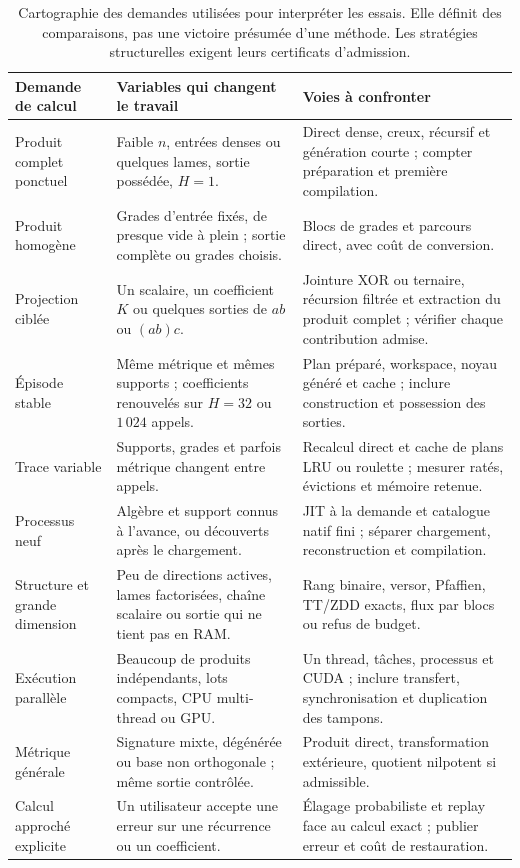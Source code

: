 \documentclass[11pt,a4paper]{article}
\begin{document}
\begin{table}[ht]
\centering\small
\begin{tabularx}{\linewidth}{@{}p{30mm}X X@{}}
\toprule
Demande de calcul & Variables qui changent le travail & Voies à confronter \\
\midrule
Produit complet ponctuel & Faible $n$, entrées denses ou quelques lames, sortie possédée, $H=1$. & Direct dense, creux, récursif et génération courte ; compter préparation et première compilation. \\
Produit homogène & Grades d'entrée fixés, de presque vide à plein ; sortie complète ou grades choisis. & Blocs de grades et parcours direct, avec coût de conversion. \\
Projection ciblée & Un scalaire, un coefficient $K$ ou quelques sorties de $ab$ ou $(ab)c$. & Jointure XOR ou ternaire, récursion filtrée et extraction du produit complet ; vérifier chaque contribution admise. \\
Épisode stable & Même métrique et mêmes supports ; coefficients renouvelés sur $H=32$ ou $1\,024$ appels. & Plan préparé, workspace, noyau généré et cache ; inclure construction et possession des sorties. \\
Trace variable & Supports, grades et parfois métrique changent entre appels. & Recalcul direct et cache de plans LRU ou roulette ; mesurer ratés, évictions et mémoire retenue. \\
Processus neuf & Algèbre et support connus à l'avance, ou découverts après le chargement. & JIT à la demande et catalogue natif fini ; séparer chargement, reconstruction et compilation. \\
Structure et grande dimension & Peu de directions actives, lames factorisées, chaîne scalaire ou sortie qui ne tient pas en RAM. & Rang binaire, versor, Pfaffien, TT/ZDD exacts, flux par blocs ou refus de budget. \\
Exécution parallèle & Beaucoup de produits indépendants, lots compacts, CPU multi-thread ou GPU. & Un thread, tâches, processus et CUDA ; inclure transfert, synchronisation et duplication des tampons. \\
Métrique générale & Signature mixte, dégénérée ou base non orthogonale ; même sortie contrôlée. & Produit direct, transformation extérieure, quotient nilpotent si admissible. \\
Calcul approché explicite & Un utilisateur accepte une erreur sur une récurrence ou un coefficient. & Élagage probabiliste et replay face au calcul exact ; publier erreur et coût de restauration. \\
\bottomrule
\end{tabularx}
\caption{Cartographie des demandes utilisées pour interpréter les essais. Elle
définit des comparaisons, pas une victoire présumée d'une méthode. Les
stratégies structurelles exigent leurs certificats d'admission.}
\label{tab:scenarios}
\end{table}
\end{document}
